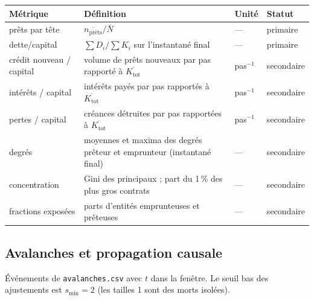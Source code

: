 \documentclass[11pt,a4paper]{article}
\newcommand{\code}[1]{\texttt{#1}}
\begin{document}
\begin{longtable}{p{}p{}p{}p{}}
\toprule
Métrique & Définition & Unité & Statut \\
\midrule
\endhead
prêts par tête & $\overline{n_{\mathrm{prêts}}}/\bar N$ & --- & primaire \\
dette/capital & $\sum D_i / \sum K_i$ sur l'instantané final & --- &
primaire \\
crédit nouveau / capital & volume de prêts nouveaux par pas rapporté à
$\overline{K_{\mathrm{tot}}}$ & pas$^{-1}$ & secondaire \\
intérêts / capital & intérêts payés par pas rapportés à
$\overline{K_{\mathrm{tot}}}$ & pas$^{-1}$ & secondaire \\
pertes / capital & créances détruites par pas rapportées à
$\overline{K_{\mathrm{tot}}}$ & pas$^{-1}$ & secondaire \\
degrés & moyennes et maxima des degrés prêteur et emprunteur (instantané
final) & --- & secondaire \\
concentration & Gini des principaux ; part du 1\,\% des plus gros contrats
& --- & secondaire \\
fractions exposées & parts d'entités emprunteuses et prêteuses & --- &
secondaire \\
\bottomrule
\end{longtable}

\subsection{Avalanches et propagation causale}

Événements de \code{avalanches.csv} avec $t$ dans la fenêtre. Le seuil bas
des ajustements est $s_{\min}=2$ (les tailles 1 sont des morts isolées).
\end{document}
